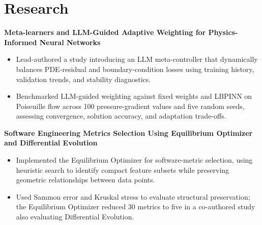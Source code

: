 \documentclass[11pt]{article}
\begin{document}
\section{Research}
\textbf{Meta-learners and LLM-Guided Adaptive Weighting for Physics-Informed Neural Networks}\par
\begin{itemize}
    \item Lead-authored a study introducing an LLM meta-controller that dynamically balances PDE-residual and boundary-condition losses using training history, validation trends, and stability diagnostics.
    \item Benchmarked LLM-guided weighting against fixed weights and LBPINN on Poiseuille flow across 100 pressure-gradient values and five random seeds, assessing convergence, solution accuracy, and adaptation trade-offs.
\end{itemize}

\vspace{3pt}
\textbf{Software Engineering Metrics Selection Using Equilibrium Optimizer and Differential Evolution}\par
\begin{itemize}
    \item Implemented the Equilibrium Optimizer for software-metric selection, using heuristic search to identify compact feature subsets while preserving geometric relationships between data points.
    \item Used Sammon error and Kruskal stress to evaluate structural preservation; the Equilibrium Optimizer reduced 30 metrics to five in a co-authored study also evaluating Differential Evolution.
\end{itemize}
\end{document}
